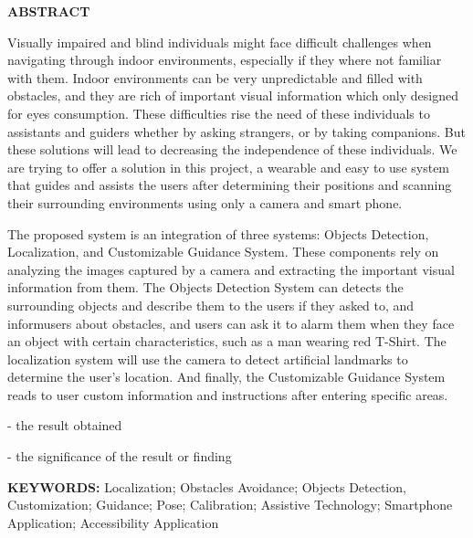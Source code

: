 

\newpage
\thispagestyle{plain}
\setcounter{page}{1}
\renewcommand{\thepage}{\roman{page}}

\begin{center}
    \Large\textbf{ABSTRACT}
\end{center}
\vspace{6pt}

Visually impaired and blind individuals might face difficult challenges when navigating through indoor environments, especially if they where not familiar with them. Indoor environments can be very unpredictable and filled with obstacles, and they are rich of important visual information which only designed for eyes consumption. These difficulties rise the need of these individuals to assistants and guiders whether by asking strangers, or by taking companions. But
these solutions will lead to decreasing the independence of these individuals. We are trying to offer a solution in this project, a wearable and easy to use system that guides and assists the users after determining their positions and scanning their surrounding environments using only a camera and smart phone. 

The proposed system is an integration of three systems: Objects Detection, Localization, and Customizable Guidance System. These components rely on analyzing the images captured by a camera and extracting the important visual information from them. The Objects Detection System can detects the surrounding objects and describe them to the users if they asked to, and informusers about obstacles, and users can ask it to alarm them when they face an object with certain characteristics, such as a man wearing red T-Shirt. The localization system will use the camera to detect artificial landmarks to determine the user’s location. And finally, the Customizable Guidance System reads to user custom information and instructions after entering specific areas.

\color{red}
- the result obtained

- the significance of the result or finding 
\color{black}

\vspace{18pt}
\noindent
\textbf{KEYWORDS:}  Localization; Obstacles Avoidance; Objects Detection, Customization; Guidance; Pose; Calibration; Assistive Technology; Smartphone Application; Accessibility Application
\vspace{3\baselineskip}